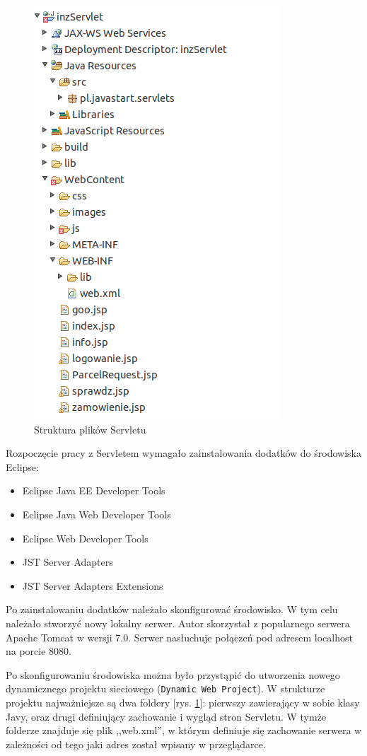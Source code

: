 \documentclass[eng,printmode,oneside]{mgr}
\begin{document}
\begin{figure}
\centering
\captionsetup{justification=centering,margin=0cm}
\vspace{-10pt}
\begin{centering}
\includegraphics[width=.45\textwidth]{strukturaServlet.png}
\end{centering}
  \caption{Struktura plików Servletu}
\label{fig:servlet}
\vspace{-60pt}
\end{figure}

Rozpoczęcie pracy z Servletem wymagało zainstalowania dodatków do środowiska
Eclipse:
\begin{itemize}
  \item Eclipse Java EE Developer Tools
  \item Eclipse Java Web Developer Tools
  \item Eclipse Web Developer Tools
  \item JST Server Adapters
  \item JST Server Adapters Extensions
\end{itemize}

Po zainstalowaniu dodatków należało skonfigurować środowisko. W tym celu
należało stworzyć nowy lokalny serwer. Autor skorzystał z popularnego serwera Apache
Tomcat w wersji 7.0. Serwer nasłuchuje połączeń pod adresem localhost na
porcie 8080.

Po skonfigurowaniu środowiska można było przystąpić do utworzenia nowego
dynamicznego projektu sieciowego (\texttt{Dynamic Web Project}). W strukturze
projektu najważniejsze są dwa foldery [rys. \ref{fig:servlet}]: pierwszy
zawierający w sobie klasy Javy, oraz drugi definiujący zachowanie i wygląd stron Servletu.
W tymże folderze znajduje się plik ,,web.xml'', w którym definiuje się
zachowanie serwera w zależności od tego jaki adres został wpisany w
przeglądarce.
\end{document}
